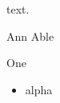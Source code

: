 \documentclass{article}
\begin{document}
 text.

Ann Able

\begin{IEEEdescription}
\item[Term] One
\end{IEEEdescription}
\begin{itemize}
\item alpha
\end{itemize}
\end{document}
